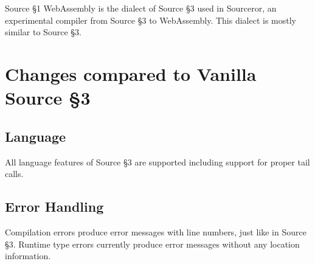 


\newcommand{\Rule}[2]{\genfrac{}{}{0.7pt}{}{{\setlength{\fboxrule}{0pt}\setlength{\fboxsep}{3mm}\fbox{$#1$}}}{{\setlength{\fboxrule}{0pt}\setlength{\fboxsep}{3mm}\fbox{$#2$}}}}

\newcommand{\TruE}{\textbf{\texttt{true}}}
\newcommand{\FalsE}{\textbf{\texttt{false}}}
\newcommand{\Rc}{\texttt{\}}}
\newcommand{\Lc}{\texttt{\{}}
\newcommand{\Rp}{\texttt{)}}
\newcommand{\Lp}{\texttt{(}}
\newcommand{\Fun}{\textbf{\texttt{function}}}
\newcommand{\Let}{\textbf{\texttt{let}}}
\newcommand{\Return}{\textbf{\texttt{return}}}
\newcommand{\Const}{\textbf{\texttt{const}}}
\newcommand{\If}{\textbf{\texttt{if}}}
\newcommand{\Else}{\textbf{\texttt{else}}}
\newcommand{\Bool}{\texttt{bool}}
\newcommand{\Number}{\texttt{number}}
\newcommand{\String}{\texttt{string}}
\newcommand{\Undefined}{\texttt{undefined}}

\newtheorem{definition}{Definition}[section]



Source \S 1 WebAssembly is the dialect of Source \S 3 used in Sourceror, an experimental compiler from Source \S 3 to WebAssembly.  This dialect is mostly similar to Source \S 3.

\section{Changes compared to Vanilla Source \S 3}

\subsection*{Language}  

All language features of Source \S 3 are supported including support for proper tail calls.

\subsection*{Error Handling}

Compilation errors produce error messages with line numbers, just like in Source \S 3.  Runtime type errors currently produce error messages without any location information.



